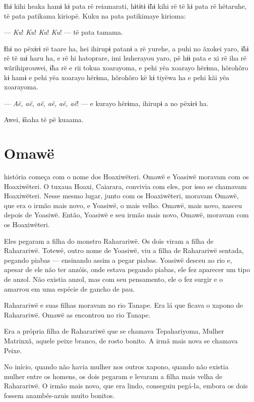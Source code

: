 Ɨhɨ kihi heaka hamɨ kɨ pata rë reiamarati, hɨtɨtɨ ɨ̃hɨ kihi rë të kɨ pata
rë hëtaruhe, të pata patikama kiriopë. Kuku na pata patikimaye kirioma:

--- \textit{Ku}! \textit{Ku}! \textit{Ku}! \textit{Ku}! --- të pata tamama. 

Ɨhɨ no pëxɨrɨ rë taare ha, hei ihirupɨ patanɨ a rë yurehe, a puhi no
ãxokei yaro, ɨ̃hɨ rë të mɨ haru ha, e rë hi hatoprare, imi huherayou
yaro, pë hɨɨ pata e xi rë iha rë wãrihiprouwei, ɨ̃ha rë e rii tokua
xoarayoma, e pehi yëa xoarayo hërɨma, hõrohõro kɨ hamɨ e pehi yëa
xoarayo hërɨma, hõrohõro kë kɨ tiyëwa ha e pehi kãi yëa xoarayoma. 

--- \textit{Aë, aë, aë, aë, aë, aë}! --- e kurayo hërɨma, ihirupɨ a no pëxɨrɨ ha. 

Awei, ɨ̃naha të pë kuaama. 

\chapter{Omawë}

 história começa com o nome dos Hoaxiwëteri. Omawë e Yoasiwë moravam
com os Hoaxiwëteri. O tuxaua Hoaxi, Caiarara, convivia com eles, por isso se
chamavam Hoaxiwëteri. Nesse mesmo lugar, junto com os Hoaxiwëteri,
moravam Omawë, que era o irmão mais novo, e Yoasiwë, o mais velho.
Omawë, mais novo, nasceu depois de Yoasiwë. Então, Yoasiwë e seu irmão
mais novo, Omawë, moravam com os Hoaxiwëteri.

Eles pegaram a filha do monstro Raharariwë. Os dois viram a filha de
Raharariwë. Totewë, outro nome de Yoasiwë, viu a filha de Raharariwë
sentada, pegando piabas --- ensinando assim a pegar piabas. Yoasiwë
desceu ao rio e, apesar de ele não ter anzóis, onde estava pegando
piabas, ele fez aparecer um tipo de anzol. Não existia anzol, mas com
seu pensamento, ele o fez surgir e o amarrou em uma espécie de gancho de pau.

Raharariwë e suas filhas moravam no rio Tanape. Era lá que ficava o
xapono de Raharariwë. Omawë as encontrou no rio Tanape. 

Era a própria filha de Raharariwë que se chamava Tepahariyoma, Mulher Matrinxã, 
aquele peixe branco, de rosto bonito. A irmã mais nova se chamava Peixe. 

No início, quando não havia mulher nos outros xapono, quando não existia
mulher entre os homens, os dois pegaram e levaram a filha mais velha de
Raharariwë. O irmão mais novo, que era lindo, conseguiu pegá-la, embora
os dois fossem anambés-azuis muito bonitos. 

